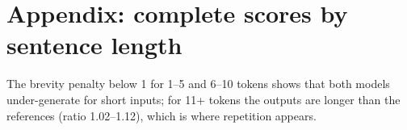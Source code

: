 \documentclass[10pt,a4paper]{article}
\begin{document}
\section{Appendix: complete scores by sentence length}
\begin{table}[H]\centering\small\tabBucketA\caption{Model A (baseline), all metrics per English-length bucket. p1--p4 are BLEU n-gram precisions in percent,
BP the brevity penalty, ratio the hypothesis/reference token ratio.}\end{table}
\begin{table}[H]\centering\small\tabBucketB\caption{Model B (attention), same columns.}\end{table}
The brevity penalty below 1 for 1--5 and 6--10 tokens shows that both models under-generate for short inputs; for 11+ tokens the outputs are longer
than the references (ratio 1.02--1.12), which is where repetition appears.
\end{document}
